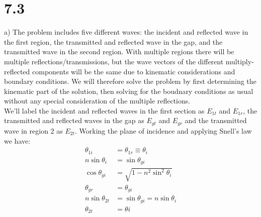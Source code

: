 \documentclass[a4paper,11pt]{article}
\numberwithin{equation}{section}
\begin{document}
\section*{7.3}
a) The problem includes five different waves: the incident and reflected wave in the first region, the transmitted and reflected wave in the gap, and the transmitted wave in the second region.
With multiple regions there will be multiple reflections/transmissions, but the wave vectors of the different multiply-reflected components will be the same due to kinematic considerations and boundary conditions.
We will therefore solve the problem by first determining the kinematic part of the solution, then solving for the boudnary conditions as usual without any special consideration of the multiple reflections.
\\
We'll label the incident and reflected waves in the first section as $E_{1t}$ and $E_{1r}$, the transmitted and reflected waves in the gap as $E_{gt}$ and $E_{gr}$ and the transmitted wave in region 2 as $E_{2t}$.
Working the plane of incidence and applying Snell's law we have:
\begin{align}
 \theta_{1i} &= \theta_{1r} \equiv \theta_i\\
 n\sin{\theta_i} &= \sin{\theta_{gi}}\\
 \cos{\theta_{gi}} &= \sqrt{1-n^2\sin^2{\theta_i}}\\
 \theta_{gr} &= \theta_{gi}\\
 n\sin{\theta_{2t}} &= \sin{\theta_{gi}} = n\sin{\theta_i}\\
 \theta_{2t} &= \theta{i}
\end{align}
\end{document}
